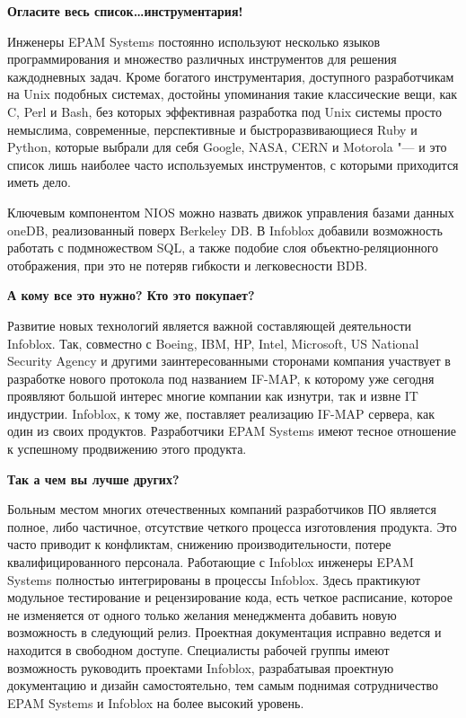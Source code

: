 \documentclass[10pt, a5paper]{article}
\begin{document}
\newpage\textbf{Огласите весь список\ldots инструментария!}

Инженеры EPAM Systems постоянно используют несколько языков программирования и множество 
различных инструментов для решения каждодневных задач. Кроме богатого инструментария, 
доступного разработчикам на Unix подобных системах, достойны упоминания такие 
классические вещи, как C, Perl и Bash, без которых эффективная разработка под Unix системы 
просто немыслима, современные, перспективные и быстроразвивающиеся Ruby и Python, 
которые выбрали для себя Google, NASA, CERN и Motorola "--- и это список лишь наиболее 
часто используемых инструментов, с которыми приходится иметь дело.

Ключевым компонентом NIOS можно назвать движок управления базами данных oneDB, 
реализованный поверх Berkeley DB. В Infoblox добавили возможность работать с 
подмножеством SQL, а также подобие слоя объектно-реляционного отображения, при это не 
потеряв гибкости и легковесности BDB.

\textbf{А кому все это нужно? Кто это покупает?}

Развитие новых технологий является важной составляющей деятельности Infoblox.  Так, 
совместно с Boeing, IBM, HP, Intel, \linebreak Microsoft, US National Security Agency и другими заинтересованными сторонами компания участвует в разработке нового протокола под 
названием IF-MAP, к которому уже сегодня проявляют большой интерес многие компании 
как изнутри, так и извне IT индустрии. Infoblox, к тому же, поставляет реализацию IF-MAP сервера, как один из своих продуктов. Разработчики EPAM Systems имеют тесное отношение к успешному продвижению этого продукта.

\textbf{Так а чем вы лучше других?}

Больным местом многих отечественных компаний разработчиков ПО является полное, либо 
частичное, отсутствие четкого процесса изготовления продукта. Это часто приводит к 
конфликтам, снижению производительности, потере квалифицированного персонала. 
Работающие с Infoblox инженеры EPAM Systems полностью интегрированы в процессы Infoblox. 
Здесь практикуют модульное тестирование и рецензирование кода, есть четкое расписание, 
которое не изменяется от одного только желания менеджмента добавить новую возможность 
в следующий релиз. Проектная документация исправно ведется и находится в свободном 
доступе. Специалисты рабочей группы имеют возможность руководить проектами Infoblox, разрабатывая проектную документацию и дизайн самостоятельно, тем самым поднимая сотрудничество EPAM Systems и Infoblox на более высокий уровень.
\end{document}
